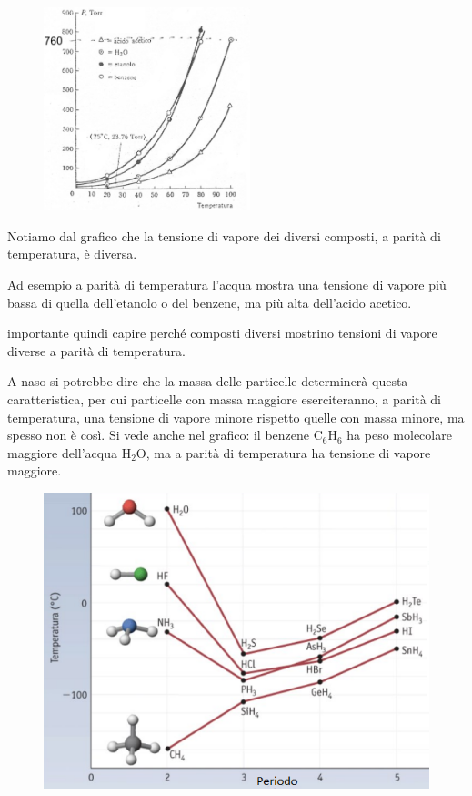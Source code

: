 \hspace{0.5cm}\begin{minipage}{0.5 \textwidth}
    \begin{figure}[H]
        \includegraphics[width=6cm]{immagini/tensioni_di_vapore.png}
    \end{figure}
\end{minipage}
\begin{minipage}{0.4 \textwidth}
\vspace{0.5cm}Notiamo dal grafico che la tensione di vapore dei diversi composti, a parità di temperatura, è diversa.

\vspace{0.2cm}Ad esempio a parità di temperatura l'acqua mostra una tensione di vapore più bassa di quella dell'etanolo o del benzene, ma più alta dell'acido acetico.
\end{minipage}

\E importante quindi capire perché composti diversi mostrino tensioni di vapore diverse a parità di temperatura.

A naso si potrebbe dire che la massa delle particelle determinerà questa caratteristica, per cui particelle con massa maggiore eserciteranno, a parità di temperatura, una tensione di vapore minore rispetto quelle con massa minore, ma spesso non è così. Si vede anche nel grafico: il benzene C$_6$H$_6$ ha peso molecolare maggiore dell'acqua H$_2$O, ma a parità di temperatura ha tensione di vapore maggiore.

\begin{figure}[htp]
    \centering
    \includegraphics[width=12cm]{immagini/temperature_ebollizione.png}
\end{figure}

